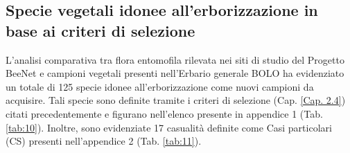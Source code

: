 \documentclass[main.tex]{subfiles}
\begin{document}
\subsection{Specie vegetali idonee all’erborizzazione in base ai criteri di selezione}

L’analisi comparativa tra flora entomofila rilevata nei siti di studio del Progetto BeeNet e campioni vegetali presenti nell’Erbario generale BOLO ha evidenziato un totale di 125 specie idonee all’erborizzazione come nuovi campioni da acquisire.
Tali specie sono definite tramite i criteri di selezione (Cap. \ref{Cap. 2.4}) citati precedentemente e figurano nell’elenco presente in appendice 1 (Tab. \ref{tab:10}). Inoltre, sono evidenziate 17 casualità definite come Casi particolari (CS) presenti nell’appendice 2 (Tab. \ref{tab:11}).
\end{document}
